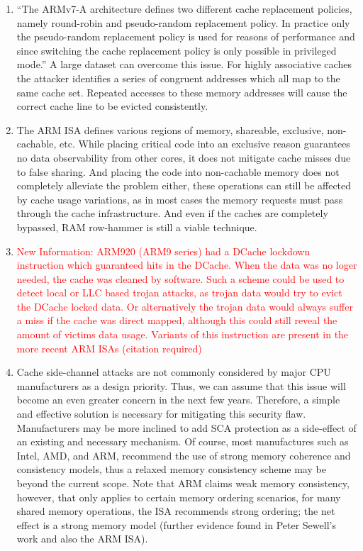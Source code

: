 \begin{enumerate}
	\item ``The ARMv7-A architecture defines two different cache replacement policies, namely round-robin and pseudo-random replacement policy. In practice only the pseudo-random replacement policy is used for reasons of performance and since switching the cache replacement policy is only possible in privileged mode.'' A large dataset can overcome this issue. For highly associative caches the attacker identifies a series of congruent addresses which all map to the same cache set. Repeated accesses to these memory addresses will cause the correct cache line to be evicted consistently.
	\item The ARM ISA defines various regions of memory, shareable, exclusive, non-cachable, etc. While placing critical code into an exclusive reason guarantees no data observability from other cores, it does not mitigate cache misses due to false sharing. And placing the code into non-cachable memory does not completely alleviate the problem either, these operations can still be affected by cache usage variations, as in most cases the memory requests must pass through the cache infrastructure. And even if the caches are completely bypassed, RAM row-hammer is still a viable technique.
	\item \textcolor{red}{New Information: ARM920 (ARM9 series) had a DCache lockdown instruction which guaranteed hits in the DCache. When the data was no loger needed, the cache was cleaned by software. Such a scheme could be used to detect local or LLC based trojan attacks, as trojan data would try to evict the DCache locked data. Or alternatively the trojan data would always suffer a miss if the cache was direct mapped, although this could still reveal the amount of victims data usage. Variants of this instruction are present in the more recent ARM ISAs (citation required)}
	\item Cache side-channel attacks are not commonly considered by major CPU manufacturers as a design priority. Thus, we can assume that this issue will become an even greater concern in the next few years. Therefore, a simple and effective solution is necessary for mitigating this security flaw. Manufacturers may be more inclined to add SCA protection as a side-effect of an existing and necessary mechanism. Of course, most manufactures such as Intel, AMD, and ARM, recommend the use of strong memory coherence and consistency models, thus a relaxed memory consistency scheme may be beyond the current scope. Note that ARM claims weak memory consistency, however, that only applies to certain memory ordering scenarios, for many shared memory operations, the ISA recommends strong ordering; the net effect is a strong memory model (further evidence found in Peter Sewell's work and also the ARM ISA).
	\end{enumerate}
	
